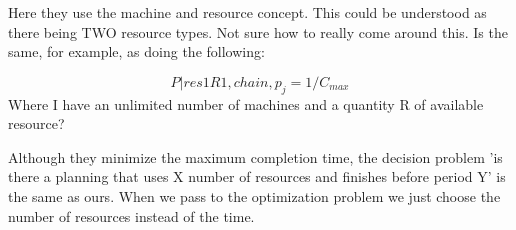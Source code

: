 \documentclass[a4paper,11pt]{article}
\begin{document}
    Here they use the machine and resource concept. This could be understood as there being TWO resource types. Not sure how to really come around this. Is the same, for example, as doing the following:

    $$P| res1R1, chain, p_j = 1 / C_{max}$$ Where I have an unlimited number of machines and a quantity R of available resource?

    Although they minimize the maximum completion time, the decision problem 'is there a planning that uses X number of resources and finishes before period Y' is the same as ours. When we pass to the optimization problem we just choose the number of resources instead of the time.


\clearpage

% 


\end{document}
